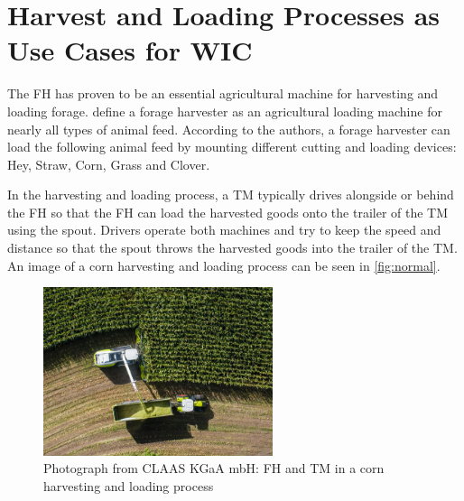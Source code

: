 \section[Use Cases for \acl{WIC}]{Harvest and Loading Processes as Use Cases for \acl{WIC}}
\label{sec:corn_harvest_scenario}
The \ac{FH} has proven to be an essential agricultural machine for harvesting and loading forage. \textcite{seifert_feldhacksler_1962} define a forage harvester as an agricultural loading machine for nearly all types of animal feed. According to the authors, a forage harvester can load the following animal feed by mounting different cutting and loading devices: Hey, Straw, Corn, Grass and Clover.

In the harvesting and loading process, a \ac{TM} typically drives alongside or behind the \ac{FH} so that the \ac{FH} can load the harvested goods onto the trailer of the \ac{TM} using the spout. Drivers operate both machines and try to keep the speed and distance so that the spout throws the harvested goods into the trailer of the TM. An image of a corn harvesting and loading process can be seen in \autoref{fig:normal}.

\begin{figure}[H]%
   \centering
   \includegraphics[width=0.6\textwidth]{figures/claas_harvest_side.png}
   \caption{Photograph from CLAAS KGaA mbH: \acf{FH} and \acf{TM} in a corn harvesting and loading process}%
   \label{fig:normal}%
\end{figure}

